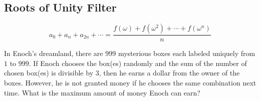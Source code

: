 \documentclass[../../../main.tex]{subfiles}
\begin{document}
\subsection{Roots of Unity Filter}

\[
a_0 + a_n + a_{2n} + \cdots
= \frac{f(\omega) + f\left(\omega^2\right) + \cdots +
    f\left(\omega^n\right)
}{n}
\]

\begin{problem}{}{}
In Enoch's dreamland, there are $999$ mysterious boxes each labeled
uniquely from $1$ to $999$. If Enoch chooses the box(es) randomly
and the sum of the number of chosen box(es) is divisible by $3$,
then he earns a dollar from the owner of the boxes. However, he is
not granted money if he chooses the same combination next time.
What is the maximum amount of money Enoch can earn?
\end{problem}
\end{document}
